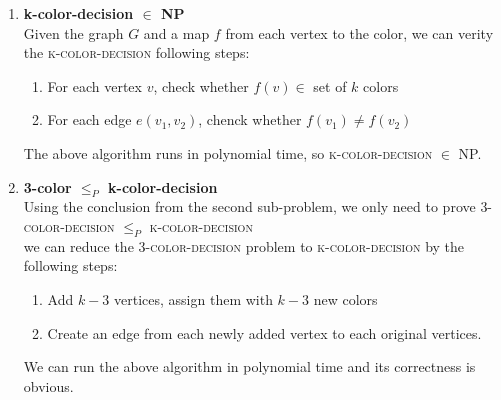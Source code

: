 \documentclass[12pt,letterpaper]{article}
\begin{document}
\begin{enumerate}
		\begin{enumerate}[itemsep=0mm]
			\item \textbf{k-color-decision $\in$ NP}\\
				Given the graph $G$ and a map $f$ from each vertex to the color, we can verity the \textsc{k-color-decision} following steps:
				\begin{enumerate}[itemsep=0mm]
					\item For each vertex $v$, check whether $f(v) \in$ set of $k$ colors
					\item For each edge $e(v_1, v_2)$, chenck whether $f(v_1) \neq f(v_2)$
				\end{enumerate}
				The above algorithm runs in polynomial time, so \textsc{k-color-decision} $\in$ NP.
			\item \textbf{3-color $\leq_P$ k-color-decision}\\
				Using the conclusion from the second sub-problem, we only need to prove \textsc{3-color-decision} $\leq_P$ \textsc{k-color-decision}\\
				we can reduce the \textsc{3-color-decision} problem to \textsc{k-color-decision} by the following steps:
				\begin{enumerate}[itemsep=0mm]
					\item Add $k-3$ vertices, assign them with $k-3$ new colors
					\item Create an edge from each newly added vertex to each original vertices.
				\end{enumerate}
				We can run the above algorithm in polynomial time and its correctness is obvious.
		\end{enumerate}
\end{enumerate}
\end{document}
